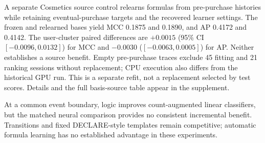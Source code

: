 A separate Cosmetics source control relearns formulas from pre-purchase histories while retaining eventual-purchase targets and the recovered learner settings. The frozen and relearned bases yield MCC 0.1875 and 0.1890, and AP 0.4172 and 0.4142. The user-cluster paired differences are $+0.0015$ (95\% CI $[-0.0096,0.0132]$) for MCC and $-0.0030$ ($[-0.0063,0.0005]$) for AP. Neither establishes a source benefit. Empty pre-purchase traces exclude 45 fitting and 21 ranking sessions without replacement; CPU execution also differs from the historical GPU run. This is a separate refit, not a replacement selected by test scores. Details and the full basis-source table appear in the supplement.


At a common event boundary, logic improves count-augmented linear classifiers, but the matched neural comparison provides no consistent incremental benefit. Transitions and fixed DECLARE-style templates remain competitive; automatic formula learning has no established advantage in these experiments.
